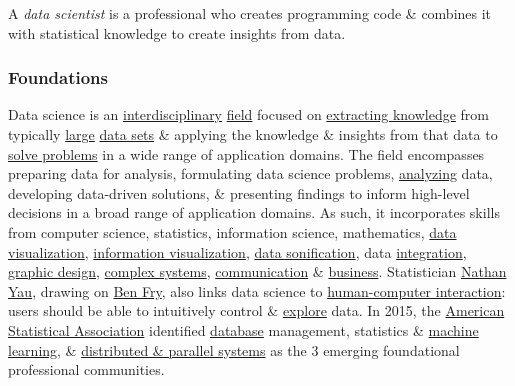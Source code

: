 \documentclass{article}
\begin{document}
A {\it data scientist} is a professional who creates programming code \& combines it with statistical knowledge to create insights from data.

\subsubsection{Foundations}
Data science is an \href{https://en.wikipedia.org/wiki/Interdisciplinarity}{interdisciplinary} \href{https://en.wikipedia.org/wiki/Academic_discipline}{field} focused on \href{https://en.wikipedia.org/wiki/Knowledge_extraction}{extracting knowledge} from typically \href{https://en.wikipedia.org/wiki/Big_data}{large} \href{https://en.wikipedia.org/wiki/Data_set}{data sets} \& applying the knowledge \& insights from that data to \href{https://en.wikipedia.org/wiki/Problem-solving}{solve problems} in a wide range of application domains. The field encompasses preparing data for analysis, formulating data science problems, \href{https://en.wikipedia.org/wiki/Analysis}{analyzing} data, developing data-driven solutions, \& presenting findings to inform high-level decisions in a broad range of application domains. As such, it incorporates skills from computer science, statistics, information science, mathematics, \href{https://en.wikipedia.org/wiki/Data_visualization}{data visualization}, \href{https://en.wikipedia.org/wiki/Information_visualization}{information visualization}, \href{https://en.wikipedia.org/wiki/Data_sonification}{data sonification}, data \href{https://en.wikipedia.org/wiki/Data_integration}{integration}, \href{https://en.wikipedia.org/wiki/Graphic_design}{graphic design}, \href{https://en.wikipedia.org/wiki/Complex_systems}{complex systems}, \href{https://en.wikipedia.org/wiki/Communication}{communication} \& \href{https://en.wikipedia.org/wiki/Business}{business}. Statistician \href{https://en.wikipedia.org/wiki/Nathan_Yau}{Nathan Yau}, drawing on \href{https://en.wikipedia.org/wiki/Ben_Fry}{Ben Fry}, also links data science to \href{https://en.wikipedia.org/wiki/Human%E2%80%93computer_interaction}{human-computer interaction}: users should be able to intuitively control \& \href{https://en.wikipedia.org/wiki/Exploration}{explore} data. In 2015, the \href{https://en.wikipedia.org/wiki/American_Statistical_Association}{American Statistical Association} identified \href{https://en.wikipedia.org/wiki/Database}{database} management, statistics \& \href{https://en.wikipedia.org/wiki/Machine_learning}{machine learning}, \& \href{https://en.wikipedia.org/wiki/Distributed_computing}{distributed \& parallel systems} as the 3 emerging foundational professional communities.
\end{document}
